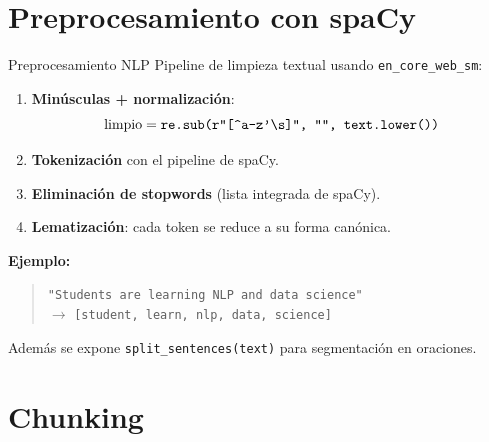 \documentclass[aspectratio=169]{beamer}
\begin{document}
\section{Preprocesamiento con spaCy}

\begin{frame}{Preprocesamiento NLP}
  Pipeline de limpieza textual usando \texttt{en\_core\_web\_sm}:
  \vspace{0.5em}
  \begin{enumerate}
    \item \textbf{Minúsculas + normalización}:
          \[
          \text{limpio} = \texttt{re.sub(r"[{\char`\^}a-z'{\char`\\}s]", "", text.lower())}
          \]
    \item \textbf{Tokenización} con el pipeline de spaCy.
    \item \textbf{Eliminación de stopwords} (lista integrada de spaCy).
    \item \textbf{Lematización}: cada token se reduce a su forma canónica.
  \end{enumerate}
  \vspace{1em}
  \textbf{Ejemplo:}
  \begin{quote}
    \texttt{"Students are learning NLP and data science"} \\[0.3em]
    $\rightarrow$ \texttt{[student, learn, nlp, data, science]}
  \end{quote}
  Además se expone \texttt{split\_sentences(text)} para segmentación en oraciones.
\end{frame}

\section{Chunking}
\end{document}

